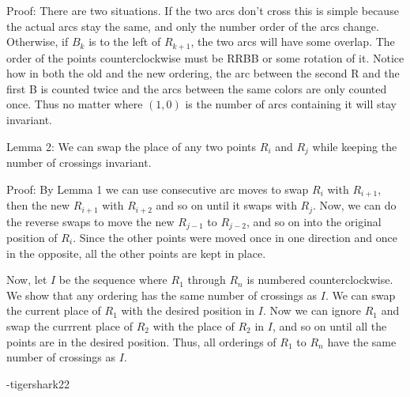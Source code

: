 \begin{enumerate}
 Proof: There are two situations. If the two arcs don't cross this is simple because the actual arcs stay the same, and only the number order of the arcs change. Otherwise, if $B_k$ is to the left of $R_{k+1}$, the two arcs will have some overlap. The order of the points counterclockwise must be RRBB or some rotation of it. Notice how in both the old and the new ordering, the arc between the second R and the first B is counted twice and the arcs between the same colors are only counted once. Thus no matter where $(1,0)$ is the number of arcs containing it will stay invariant.

 Lemma 2: We can swap the place of any two points $R_i$ and $R_j$ while keeping the number of crossings invariant.

 Proof: By Lemma 1 we can use consecutive arc moves to swap $R_i$ with $R_{i+1}$, then the new $R_{i+1}$ with $R_{i+2}$ and so on until it swaps with $R_j$. Now, we can do the reverse swaps to move the new $R_{j-1}$ to $R_{j-2}$, and so on into the original position of $R_i$. Since the other points were moved once in one direction and once in the opposite, all the other points are kept in place.

 Now, let $I$ be the sequence where $R_1$ through $R_n$ is numbered counterclockwise. We show that any ordering has the same number of crossings as $I$. We can swap the current place of $R_1$ with the desired position in $I$. Now we can ignore $R_1$ and swap the currrent place of $R_2$ with the place of $R_2$ in $I$, and so on until all the points are in the desired position. Thus, all orderings of $R_1$ to $R_n$ have the same number of crossings as $I$.

 -tigershark22

 


\end{enumerate}